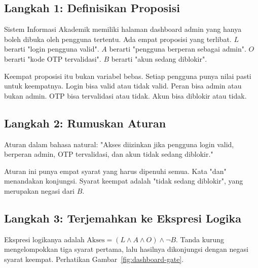 \documentclass[11pt,a4paper]{article}
\begin{document}
\subsection{Langkah 1: Definisikan Proposisi}

Sistem Informasi Akademik memiliki halaman dashboard admin yang hanya boleh dibuka oleh pengguna tertentu. Ada empat proposisi yang terlibat. $L$ berarti "login pengguna valid". $A$ berarti "pengguna berperan sebagai admin". $O$ berarti "kode OTP tervalidasi". $B$ berarti "akun sedang diblokir".

Keempat proposisi itu bukan variabel bebas. Setiap pengguna punya nilai pasti untuk keempatnya. Login bisa valid atau tidak valid. Peran bisa admin atau bukan admin. OTP bisa tervalidasi atau tidak. Akun bisa diblokir atau tidak.

\subsection{Langkah 2: Rumuskan Aturan}

Aturan dalam bahasa natural: "Akses diizinkan jika pengguna login valid, berperan admin, OTP tervalidasi, dan akun tidak sedang diblokir."

Aturan ini punya empat syarat yang harus dipenuhi semua. Kata "dan" menandakan konjungsi. Syarat keempat adalah "tidak sedang diblokir", yang merupakan negasi dari $B$.

\subsection{Langkah 3: Terjemahkan ke Ekspresi Logika}

Ekspresi logikanya adalah $\text{Akses}=(L \wedge A \wedge O) \wedge \neg B$. Tanda kurung mengelompokkan tiga syarat pertama, lalu hasilnya dikonjungsi dengan negasi syarat keempat. Perhatikan Gambar~\ref{fig:dashboard-gate}.
\end{document}
